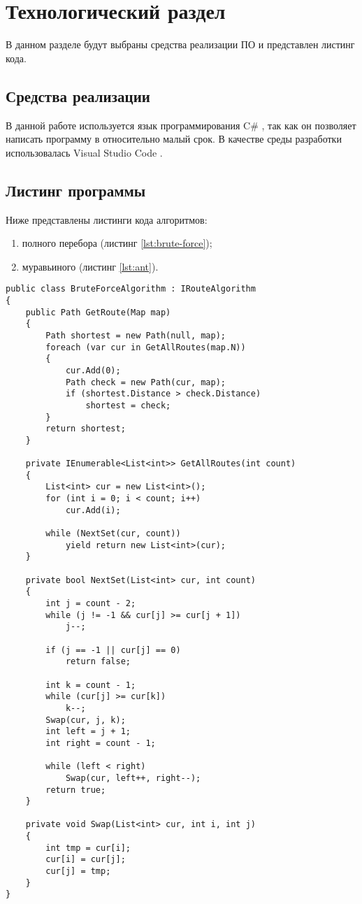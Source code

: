 \chapter{ Технологический раздел}
\label{cha:technological}

    В данном разделе будут выбраны средства реализации ПО и представлен листинг кода. 

    \section{Средства реализации}
        В данной работе используется язык программирования C\# \cite{c-sharp}, так как
        он позволяет написать программу в относительно малый срок.
        В качестве среды разработки использовалась Visual Studio Code \cite{binary-search}. 

    \section{Листинг программы}
        Ниже представлены листинги кода алгоритмов:
        \begin{enumerate}
            \item полного перебора (листинг \ref{lst:brute-force});
            \item муравьиного (листинг \ref{lst:ant}).
        \end{enumerate}
        
        \begin{lstlisting}[language={[Sharp]C}, label=lst:brute-force, caption=Реализация алгоритма поиска полным перебором]
public class BruteForceAlgorithm : IRouteAlgorithm
{
    public Path GetRoute(Map map)
    {
        Path shortest = new Path(null, map);
        foreach (var cur in GetAllRoutes(map.N))
        {
            cur.Add(0);
            Path check = new Path(cur, map);
            if (shortest.Distance > check.Distance)
                shortest = check;
        }
        return shortest;
    }

    private IEnumerable<List<int>> GetAllRoutes(int count)
    {
        List<int> cur = new List<int>();
        for (int i = 0; i < count; i++)
            cur.Add(i);

        while (NextSet(cur, count))
            yield return new List<int>(cur);
    }

    private bool NextSet(List<int> cur, int count)
    {
        int j = count - 2;
        while (j != -1 && cur[j] >= cur[j + 1]) 
            j--;

        if (j == -1 || cur[j] == 0)
            return false;

        int k = count - 1;
        while (cur[j] >= cur[k])
            k--;
        Swap(cur, j, k);
        int left = j + 1;
        int right = count - 1;

        while (left < right)
            Swap(cur, left++, right--);
        return true;
    }

    private void Swap(List<int> cur, int i, int j)
    {
        int tmp = cur[i];
        cur[i] = cur[j];
        cur[j] = tmp;
    }
}
        \end{lstlisting}

